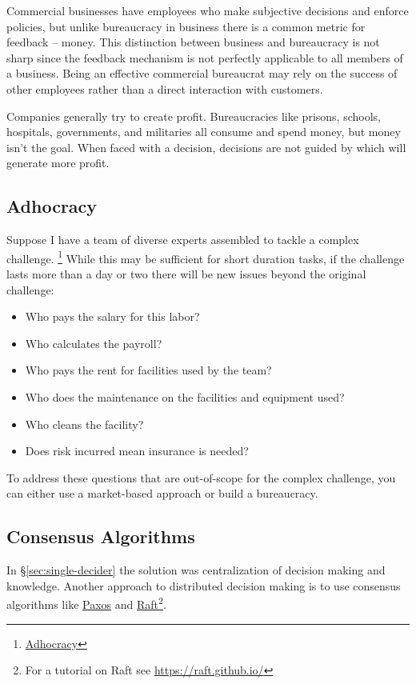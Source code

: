 Commercial businesses have employees who make subjective decisions and enforce policies, but unlike bureaucracy in business there is a common metric for feedback -- money. This distinction between business and bureaucracy is not sharp since the feedback mechanism is not perfectly applicable to all members of a business. Being an effective commercial bureaucrat may rely on the success of other employees rather than a direct interaction with customers.

Companies generally try to create profit. 
Bureaucracies like prisons, schools, hospitals, governments, and militaries all consume and spend money, but money isn't the goal. When faced with a decision, decisions are not guided by which will generate more profit. \cite{2012_Wilson}

\subsection{Adhocracy}

Suppose I have a team of diverse experts assembled to tackle a complex challenge.
\footnote{\href{https://en.wikipedia.org/wiki/Adhocracy}{Adhocracy}}
While this may be sufficient for short duration tasks, if the challenge lasts more than a day or two there will be new issues beyond the original challenge:

\begin{itemize}
    \item Who pays the salary for this labor?
    \item Who calculates the payroll?
    \item Who pays the rent for facilities used by the team?
    \item Who does the maintenance on the facilities and equipment used?
    \item Who cleans the facility?
    \item Does risk incurred mean insurance is needed?
\end{itemize}
To address these questions that are out-of-scope for the complex challenge, you can either use a market-based approach or build a bureaucracy. 

\subsection{Consensus Algorithms}

In \S\ref{sec:single-decider} the solution was centralization of decision making and knowledge. Another approach to distributed decision making is to use consensus algorithms like \href{https://en.wikipedia.org/wiki/Paxos_(computer_science)}{Paxos} and \href{https://en.wikipedia.org/wiki/Raft_(algorithm)}{Raft}\footnote{For a tutorial on Raft see \href{https://raft.github.io/}{https://raft.github.io/}}.


